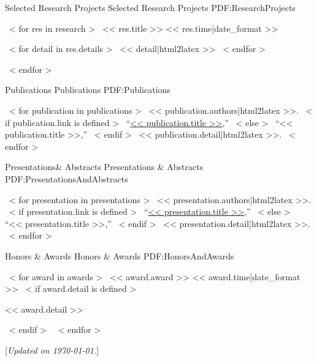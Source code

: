 \documentclass[letterpaper,MMMyyyy,nonstopmode]{simpleresumecv}
\newcommand{\CVNote}{Updated on {\today}.}
\begin{document}
\begin{Body}
\Section
{Selected Research Projects}
{Selected Research Projects}
{PDF:ResearchProjects}

~< for res in research >~
    \Entry
    << res.title >>
    \hfill
    << res.time|date_format >>
    \begin{Detail}
    ~< for detail in res.details >~
        \BulletItem
        << detail|html2latex >>
    ~< endfor >~
    \end{Detail}
~< endfor >~


\Section
{Publications}
{Publications}
{PDF:Publications}

~< for publication in publications >~
    \Entry
    << publication.authors|html2latex >>.
    ~< if publication.link is defined >~
        ``\href{<< publication.link >>}{<< publication.title >>},''
    ~< else >~
        ``<< publication.title >>,''
    ~< endif >~
    << publication.detail|html2latex >>.
    \Gap
~< endfor >~


\Section
{Presentations\newline\& Abstracts}
{Presentations \& Abstracts}
{PDF:PresentationsAndAbstracts}

~< for presentation in presentations >~
    \Entry
    << presentation.authors|html2latex >>.
    ~< if presentation.link is defined >~
        ``\href{<< presentation.link >>}{<< presentation.title >>},''
    ~< else >~
        ``<< presentation.title >>,''
    ~< endif >~
    << presentation.detail|html2latex >>.
    \Gap
~< endfor >~


\Section
{Honors \& Awards}
{Honors \& Awards}
{PDF:HonorsAndAwards}

~< for award in awards >~
    \BulletItem
    << award.award >>
    \hfill
    << award.time|date_format >>
    ~< if award.detail is defined >~
        \begin{Detail}
        \Item
        << award.detail >>
        \end{Detail}
    ~< endif >~
    \Gap
~< endfor >~

\end{Body}


\BigGap
\UseNoteFont%
\null\hfill%
[\textit{\CVNote}]
\end{document}
